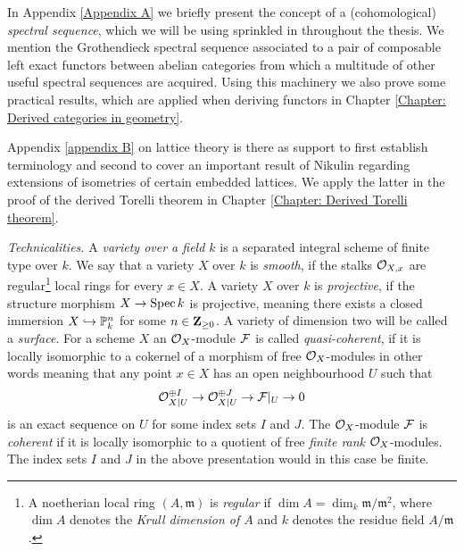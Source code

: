 

In Appendix \ref{Appendix A} we briefly present the concept of a (cohomological) \emph{spectral sequence}, which we will be using sprinkled in throughout the thesis. We mention the Grothendieck spectral sequence associated to a pair of composable left exact functors between abelian categories from which a multitude of other useful spectral sequences are acquired. Using this machinery we also prove some practical results, which are applied when deriving functors in Chapter \ref{Chapter: Derived categories in geometry}. 

Appendix \ref{appendix B} on lattice theory is there as support to first establish terminology and second to cover an important result of Nikulin \cite{Nikulin1980} regarding extensions of isometries of certain embedded lattices. We apply the latter in the proof of the derived Torelli theorem in Chapter \ref{Chapter: Derived Torelli theorem}. 

\vspace{0.3cm}
\noindent
\textsl{Technicalities.}
A \emph{variety over a field $k$} is a separated integral scheme of finite type over $k$. We say that a variety $X$ over $k$ is \emph{smooth}, if the stalks ${\mathcal{O}_{X, x}}$ are regular\footnote{A noetherian local ring $(A, \mathfrak{m})$ is \emph{regular} if $\dim A = \dim_k \mathfrak{m}/\mathfrak{m}^2$, where $\dim A$ denotes the \emph{Krull dimension of $A$} and $k$ denotes the residue field $A/\mathfrak{m}$.} local rings for every $x \in X$. A variety $X$ over $k$ is \emph{projective}, if the structure morphism $X \to \operatorname{Spec}k$ is projective, meaning there exists a closed immersion $X \hookrightarrow \mathbb P^n_k$ for some $n \in \mathbf Z_{\geq 0}$. A variety of dimension two will be called a \emph{surface}. For a scheme $X$ an ${\mathcal{O}_{X}}$-module $\mathcal F$ is called \emph{quasi-coherent}, if it is locally isomorphic to a cokernel of a morphism of free ${\mathcal{O}_{X}}$-modules in other words meaning that any point $x \in X$ has an open neighbourhood $U$ such that 
\[
    \mathcal O_{X|U}^{\oplus I} \to \mathcal O_{X|U}^{\oplus J} \to \mathcal F|_U \to 0
\]
is an exact sequence on $U$ for some index sets $I$ and $J$. The ${\mathcal{O}_{X}}$-module $\mathcal F$ is \emph{coherent} if it is locally isomorphic to a quotient of free \emph{finite rank} ${\mathcal{O}_{X}}$-modules. The index sets $I$ and $J$ in the above presentation would in this case be finite.
